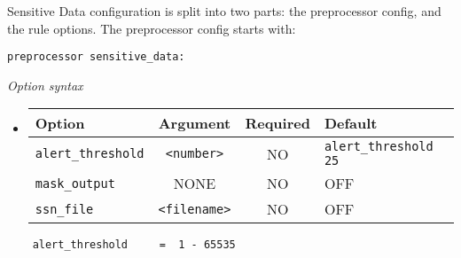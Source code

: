 \documentclass[english]{report}
\begin{document}
Sensitive Data configuration is split into two parts: the preprocessor config,
and the rule options. The preprocessor config starts with:

\begin{verbatim}
preprocessor sensitive_data:
\end{verbatim}

\textit{Option syntax}
\begin{itemize}

\item[]
\begin{tabular}{|l|c|c|p{6cm}|}
\hline
Option & Argument & Required & Default\\
\hline
\hline
\texttt{alert\_threshold} & \texttt{<number>} & NO & \texttt{alert\_threshold 25}\\
\hline
\texttt{mask\_output} & NONE & NO & OFF\\
\hline
\texttt{ssn\_file} & \texttt{<filename>} & NO & OFF\\
\hline
\end{tabular}
\end{itemize}

\footnotesize
\begin{verbatim}
    alert_threshold     =  1 - 65535
\end{verbatim}
\normalsize
\end{document}

